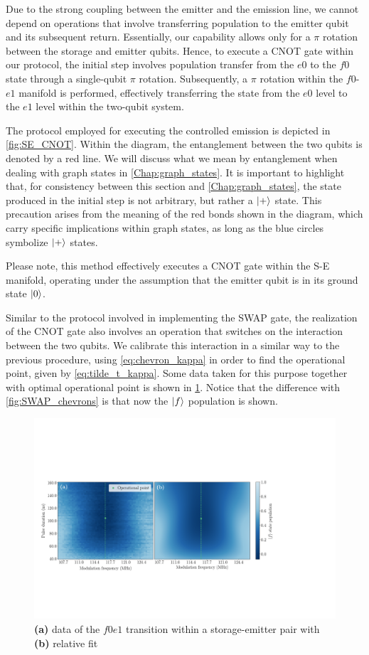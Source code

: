 Due to the strong coupling between the emitter and the emission line, we cannot depend on operations that involve transferring population to the emitter qubit and its subsequent return.
Essentially, our capability allows only for a $\pi$ rotation between the storage and emitter qubits.
Hence, to execute a CNOT gate within our protocol, the initial step involves population transfer from the $e0$ to the $f0$ state through a single-qubit $\pi$ rotation. 
Subsequently, a $\pi$ rotation within the $f0$-$e1$ manifold is performed, effectively transferring the state from the $e0$ level to the $e1$ level within the two-qubit system.

The protocol employed for executing the controlled emission is depicted in \cref{fig:SE_CNOT}.
Within the diagram, the entanglement between the two qubits is denoted by a red line. We will discuss what we mean by entanglement when dealing with graph states in \cref{Chap:graph_states}.
It is important to highlight that, for consistency between this section and \cref{Chap:graph_states}, the state produced in the initial step is not arbitrary, but rather a $\ket{+}$ state.
This precaution arises from the meaning of the red bonds shown in the diagram, which carry specific implications within graph states, as long as the blue circles symbolize $\ket{+}$ states.

Please note, this method effectively executes a CNOT gate within the S-E manifold, operating under the assumption that the emitter qubit is in its ground state $\ket{0}$.

Similar to the protocol involved in implementing the SWAP gate, the realization of the CNOT gate also involves an operation that switches on the interaction between the two qubits. 
We calibrate this interaction in a similar way to the previous procedure, using \cref{eq:chevron_kappa}  in order to find the operational point, given by \cref{eq:tilde_t_kappa}.
Some data taken for this purpose together with optimal operational point is shown in \cref{fig:CNOT_data}.
Notice that the difference with \cref{fig:SWAP_chevrons} is that now the $\ket{f}$ population is shown.

\begin{figure}
    \centering
    \includegraphics[width = \textwidth]{Images/Chap3/a_2.pdf}
    \caption{\textbf{(a)} data of the $f0e1$ transition within a storage-emitter pair with \textbf{(b)} relative fit}
    \label{fig:CNOT_data}
\end{figure}
